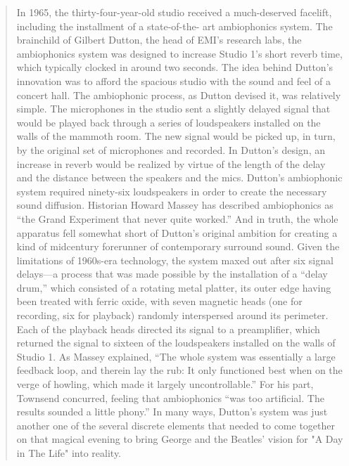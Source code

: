 \begin{quote}

In 1965, the thirty-four-year-old studio
received a much-deserved facelift, including the installment of a state-of-the-
art ambiophonics system. The brainchild of Gilbert Dutton, the head of EMI’s
research labs, the ambiophonics system was designed to increase Studio 1’s
short reverb time, which typically clocked in around two seconds. The idea
behind Dutton’s innovation was to afford the spacious studio with the sound and feel of a concert hall.
The ambiophonic process, as Dutton devised it, was relatively simple. The microphones in the studio sent a slightly delayed signal that would be played back through a series of loudspeakers installed on the walls of the mammoth room. The new signal would be picked up, in turn, by the original set of microphones and recorded. In Dutton’s design, an increase in reverb would be realized by virtue of the length of the delay and the distance between the speakers and the mics. Dutton’s ambiophonic system required ninety-six loudspeakers in order to create the necessary sound diffusion. Historian Howard Massey has described ambiophonics as “the Grand Experiment that never quite worked.” And in truth, the whole apparatus fell somewhat short of Dutton’s original ambition for creating a kind of midcentury forerunner of contemporary surround sound.
Given the limitations of 1960s-era technology, the system maxed out after six signal delays—a
process that was made possible by the installation of a “delay drum,” which
consisted of a rotating metal platter, its outer edge having been treated with
ferric oxide, with seven magnetic heads (one for recording, six for playback)
randomly interspersed around its perimeter. Each of the playback heads
directed its signal to a preamplifier, which returned the signal to sixteen of the
loudspeakers installed on the walls of Studio 1. As Massey explained, “The
whole system was essentially a large feedback loop, and therein lay the rub: It
only functioned best when on the verge of howling, which made it largely
uncontrollable.” For his part, Townsend concurred, feeling that ambiophonics
“was too artificial. The results sounded a little phony.” In many ways,
Dutton’s system was just another one of the several discrete elements that
needed to come together on that magical evening to bring George and the Beatles' vision for "A Day in The Life" into reality.

\end{quote}


